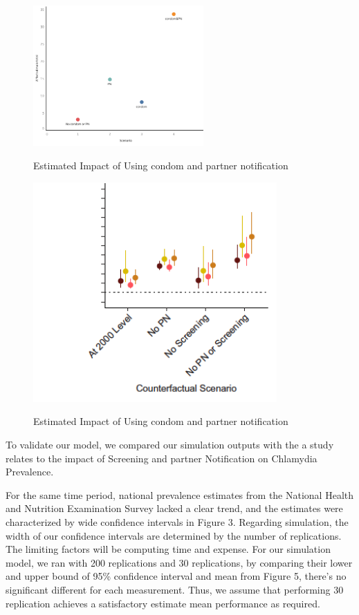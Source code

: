 \documentclass{article}
\begin{document}
\begin{normalsize}
\begin{figure}[H]
\caption{Estimated Impact of Using condom and partner notification}
\centering
\includegraphics[width=0.58\textwidth]{plt3.png}
\label{fig:plt4}
\end{figure}


\begin{figure}[H]
\caption{Estimated Impact of Using condom and partner notification}
\includegraphics[width=0.83\textwidth]{plt2.png}
\label{fig:plt2}
\end{figure}

To validate our model, we compared our simulation outputs with the a study relates to the impact of Screening and partner Notification on Chlamydia Prevalence\cite{galer_et2019}.

 For the same time period, national prevalence estimates from the National Health and Nutrition Examination Survey lacked a clear trend, and the estimates were characterized by wide confidence intervals in Figure 3\cite{galer_et2019}. Regarding simulation, the width of our confidence intervals are determined by the number of replications. The limiting factors will be computing time and expense. For our simulation model, we ran with 200 replications and 30 replications, by comparing their lower and upper bound of 95\% confidence interval and mean from Figure 5, there's no significant different for each measurement. Thus, we assume that performing 30 replication achieves a satisfactory estimate mean performance as required. \\
 

\end{normalsize}
\end{document}
